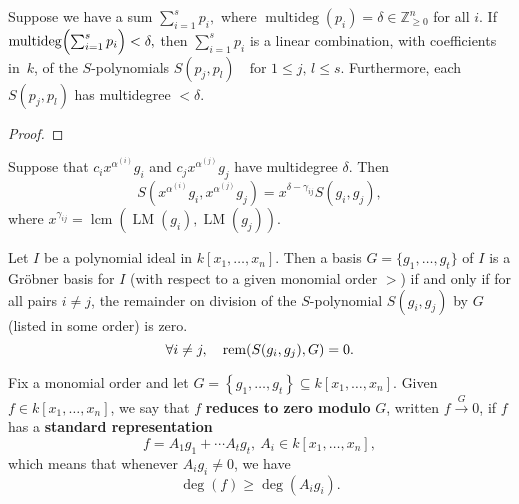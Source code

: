 \begin{lemma}\label{lem:Spolynomial_syzygy_of_degree_cancellation} %
    \leanok %
    Suppose we have a sum $\sum_{i=1}^s p_i,$ where $\operatorname{multideg}(p_i)=\delta\in\mathbb Z_{\ge0}^n$ for all $i$.
    If $\operatorname{multideg}\Bigl(\sum_{i=1}^s p_i\Bigr)<\delta,$ then $\sum_{i=1}^s p_i$ is a linear combination, with coefficients in~$k$, of the $S$-polynomials $S(p_j,p_l)\quad\text{for }1\le j,\,l\le s$.
    Furthermore, each $S(p_j,p_l)$ has multidegree $<\delta$.
\end{lemma}
\begin{proof}
  \leanok %
\end{proof}

\begin{lemma}\label{lem:S-polynomials and Monomial Multiplication} %
  \leanok %
  Suppose that $c_i x^{\alpha^{(i)}} g_i$ and $c_j x^{\alpha^{(j)}} g_j$ have multidegree $\delta$. Then
  \[
  S(x^{\alpha^{(i)}} g_i, x^{\alpha^{(j)}} g_j) = x^{\delta - \gamma_{ij}} S(g_i, g_j),
  \]
  where $x^{\gamma_{ij}} = \operatorname{lcm}(\operatorname{LM}(g_i), \operatorname{LM}(g_j))$.
\end{lemma}

\begin{theorem}\label{thm:Buchberger’s Criterion} %
    Let $I$ be a polynomial ideal in $k[x_1, \dots, x_n]$. 
    Then a basis $G = \{g_1, \dots , g_t\}$ of $I$ is a Gr{\"o}bner basis for $I$ (with respect to a given monomial order $>$)
    if and only if for all pairs $i \neq j$, the remainder on division of the $S$-polynomial $S(g_i, g_j)$ by $G$ (listed in some order) is zero.
    \[ \forall i \neq j, \quad \operatorname{rem}(S(g_i, g_j), G) = 0. \]
\end{theorem}

\begin{definition}\label{def:reduces_to_zero} %
    Fix a monomial order and let $G = \left\{g_1, \ldots , g_t\right\} \subseteq k[x_1, \ldots , x_n]$.
    Given $f \in k[x_1, \ldots , x_n]$, we say that $f$ \textbf{reduces to zero modulo} $G$, written $f \xrightarrow{G} 0$,
    if $f$ has a \textbf{standard representation}
    \[ f = A_1g_1 + \cdots A_tg_t,\ A_i \in k[x_1, \ldots , x_n],\]
    which means that whenever $A_ig_i \neq 0$, we have
    \[\operatorname{deg}(f) \geq \operatorname{deg}(A_ig_i).\]
\end{definition}

